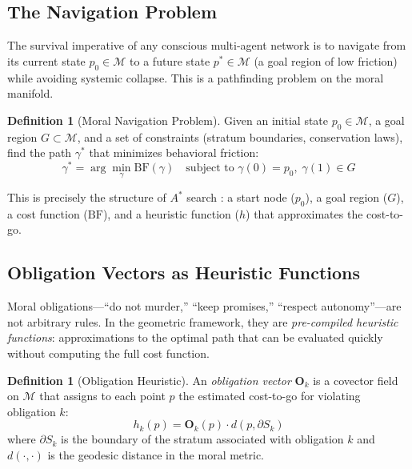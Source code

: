 \documentclass[12pt]{article}
\theoremstyle{definition}
\newtheorem{definition}[theorem]{Definition}
\theoremstyle{remark}
\newcommand{\M}{\mathcal{M}}
\newcommand{\Ob}{\mathbf{O}}
\newcommand{\BF}{\mathrm{BF}}
\begin{document}
\subsection{The Navigation Problem}

The survival imperative of any conscious multi-agent network is to navigate from its current state $p_0 \in \M$ to a future state $p^* \in \M$ (a goal region of low friction) while avoiding systemic collapse. This is a pathfinding problem on the moral manifold.

\begin{definition}[Moral Navigation Problem]
Given an initial state $p_0 \in \M$, a goal region $G \subset \M$, and a set of constraints (stratum boundaries, conservation laws), find the path $\gamma^*$ that minimizes behavioral friction:
\begin{equation}
\gamma^* = \arg\min_\gamma \BF(\gamma) \quad \text{subject to } \gamma(0) = p_0,\; \gamma(1) \in G
\label{eq:nav}
\end{equation}
\end{definition}

This is precisely the structure of $A^*$ search \citep{hart1968}: a start node ($p_0$), a goal region ($G$), a cost function ($\BF$), and a heuristic function ($h$) that approximates the cost-to-go.

\subsection{Obligation Vectors as Heuristic Functions}

Moral obligations---``do not murder,'' ``keep promises,'' ``respect autonomy''---are not arbitrary rules. In the geometric framework, they are \emph{pre-compiled heuristic functions}: approximations to the optimal path that can be evaluated quickly without computing the full cost function.

\begin{definition}[Obligation Heuristic]
An \emph{obligation vector} $\Ob_k$ is a covector field on $\M$ that assigns to each point $p$ the estimated cost-to-go for violating obligation $k$:
\begin{equation}
h_k(p) = \Ob_k(p) \cdot d(p, \partial S_k)
\label{eq:heuristic}
\end{equation}
where $\partial S_k$ is the boundary of the stratum associated with obligation $k$ and $d(\cdot, \cdot)$ is the geodesic distance in the moral metric.
\end{definition}
\end{document}
